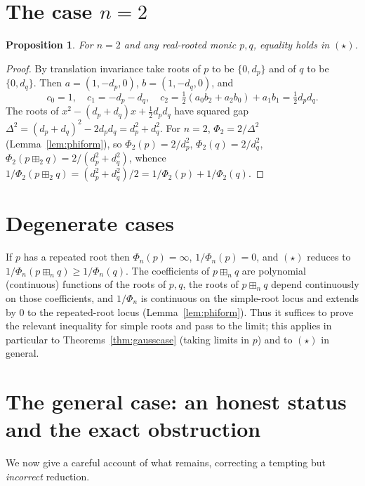 \documentclass[12pt]{article}
\newtheorem{proposition}{Proposition}
\theoremstyle{remark}
\newcommand{\boxp}{\boxplus_n}
\begin{document}
\section{The case $n=2$}\label{sec:n2}

\begin{proposition}\label{prop:n2}
For $n=2$ and any real-rooted monic $p,q$, equality holds in $(\star)$.
\end{proposition}

\begin{proof}
By translation invariance take roots of $p$ to be $\{0,d_p\}$ and of $q$ to be
$\{0,d_q\}$.  Then $a=(1,-d_p,0)$, $b=(1,-d_q,0)$, and
\[
c_0=1,\quad c_1=-d_p-d_q,\quad
c_2=\tfrac12(a_0b_2+a_2b_0)+a_1b_1=\tfrac12 d_pd_q .
\]
The roots of $x^2-(d_p+d_q)x+\tfrac12 d_pd_q$ have squared gap
$\Delta^2=(d_p+d_q)^2-2d_pd_q=d_p^2+d_q^2$.  For $n=2$,
$\Phi_2=2/\Delta^2$ (Lemma~\ref{lem:phiform}), so
$\Phi_2(p)=2/d_p^2$, $\Phi_2(q)=2/d_q^2$,
$\Phi_2(p\boxplus_2q)=2/(d_p^2+d_q^2)$, whence
$1/\Phi_2(p\boxplus_2q)=(d_p^2+d_q^2)/2=1/\Phi_2(p)+1/\Phi_2(q)$.
\end{proof}

\section{Degenerate cases}\label{sec:degenerate}

If $p$ has a repeated root then $\Phi_n(p)=\infty$, $1/\Phi_n(p)=0$, and
$(\star)$ reduces to $1/\Phi_n(p\boxp q)\ge1/\Phi_n(q)$.  The coefficients of
$p\boxp q$ are polynomial (continuous) functions of the roots of $p,q$, the
roots of $p\boxp q$ depend continuously on those coefficients, and $1/\Phi_n$
is continuous on the simple-root locus and extends by $0$ to the repeated-root
locus (Lemma~\ref{lem:phiform}).  Thus it suffices to prove the relevant
inequality for simple roots and pass to the limit; this applies in particular
to Theorems~\ref{thm:gausscase} (taking limits in $p$) and to $(\star)$ in
general.

\section{The general case: an honest status and the exact obstruction}
\label{sec:gap}

We now give a careful account of what remains, correcting a tempting but
\emph{incorrect} reduction.
\end{document}

